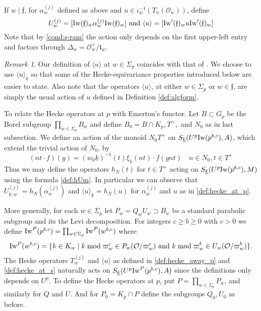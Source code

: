 \documentclass[leqno]{amsart}
\theoremstyle{definition}
\theoremstyle{remark}
\newtheorem{rem}[thm]{Remark}
\newcommand{\oo}{\mathcal{O}}
\newcommand{\ff}{\mathfrak{f}}
\newcommand{\ft}{\mathfrak{t}}
\newcommand{\wt}[1]{\underline{ #1 }}
\newcommand{\Iw}{\textnormal{Iw}} %
\begin{document}
If $w\mid \ff$,
for $\alpha_w^{(j)}$ defined as above
and $u\in \iota_w^{-1}(T_n(\oo_w))$, define 
\begin{equation}\label{def:hecke_at_s}
	U_{w}^{(j)}=
	[\Iw(\ff)_w\alpha_w^{(j)}\Iw(\ff)_w]
	\text{ and }
	\langle u\rangle= 
	[\Iw'(\ff)_wu\Iw'(\ff)_w]
\end{equation}
Note that by \eqref{cond:s-ram}
the action only depends on the first upper-left entry
and factors through $\Delta_w=\oo_w^\times/\ft_w$.
\begin{rem}
	Our definition of $\langle u\rangle$ at $w\in \Sigma_p$
	coincides with that of \cite{ger}.
    We choose to use $\langle u\rangle_{\wt{k}}$
    so that some of the Hecke-equivariance properties
    introduced below are easier to state.
    Also note that the operators $\langle u\rangle$,
    at either $w\in\Sigma_p$ or $w\in \ff$,
    are simply the usual action of $u$
    defined in Definition \ref{def:algform}.
\end{rem}

To relate the Hecke operators at $p$
with Emerton's functor.
Let $B\subset G_p$ be the Borel subgroup $\prod_{w\in \Sigma_p} B_w$
and define $B_0=B\cap K_p, T^+,$ and $N_0$ as in last subsection.
We define an action of the monoid $N_0T^+$ 
on $S_{\wt{k}}(U^p\Iw(p^{b,c}),A)$,
which extend the trivial action of $N_0$, by
\begin{equation}\label{def:T_act}
	(nt\cdot f)(g)=(w_0\wt{k})^{-1}(t)\xi_{\wt{k}}(nt)\cdot f(gnt)\quad
    n\in N_0, t\in T^+
\end{equation}
Thus we may define the operators $h_N(t)$
for $t\in T^+$
acting on  $S_{\wt{k}}(U^p\Iw(p^{b,c}),M)$
using the formula \eqref{def:hUm}.
In particular we can observe that
$U_{\wt{k},w}^{(j)}=h_N(\alpha_{w}^{(j)})$ and 
$\langle u\rangle_{\wt{k}}= h_N(u)$
for $\alpha_w^{(j)}$ and $u$ as in \eqref{def:hecke_at_p}. 

More generally, for each  $w\in \Sigma_p$
let $P_w=Q_wU_w\supset B_w$ 
be a standard parabolic subgroup
and its the Levi decomposition.
For integers  $c\geq b\geq 0$ with $c>0$
we define $\Iw^P(p^{b,c})=\prod_{w\in\Sigma_p}\Iw^P(w^{b,c})$ where
\begin{equation}\label{def:Iwahori_P}
	\Iw^P(w^{b,c})=\{
	k\in K_w\mid 
    k \bmod \varpi_w^c \in P_w(\oo/\varpi_w^c)
	\text{ and }
	k \bmod \varpi_w^b \in U_w(\oo/\varpi_w^b)
	\}.
\end{equation}
The Hecke operators $T_w^{(j)}$ and $\langle u\rangle$
as defined in \eqref{def:hecke_away_p} and 
\eqref{def:hecke_at_s} naturally 
acts on  $S_{\wt{k}}(U^p\Iw^P(p^{b,c}),A)$
since the definitions only depends on $U^p$.
To define the Hecke operators at $p$, put
$P=\prod_{w\in \Sigma_p}P_w$, and similarly for $Q$ and $U$.
And for $P_0=K_p\cap P$ define the subgroups $Q_0, U_0$ as before.
\end{document}
